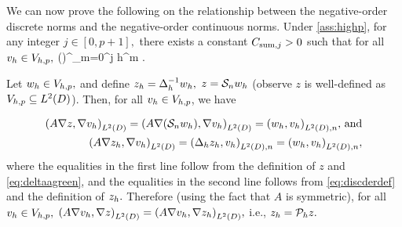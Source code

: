 
We can now prove the following  on the relationship between the negative-order discrete norms and the negative-order continuous norms.
\label{lem:negdiscsum}
Under \cref{ass:highp}, for any integer $j \in [0,p+1],$ there exists a constant $C_{\mathrm{sum},j} > 0$ such that for all $v_{h} \in V_{h,p},$
\beqs
{} \leq \mleft(\En\nvar\mright)^{}\Csumj \sum_{m=0}^j h^{m} .
\eeqs
\ele

Let $w_{h} \in V_{h,p},$ and define $z_{h} = \Delta_{h}^{-1} w_{h},$ $z = \mathcal S_{n} w_{h}$ (observe $z$ is well-defined as $\Vhp \subseteq \LtD$). Then, for all $v_{h} \in V_{h,p}$, we have

\begin{align*}
\IPLtD{A \grad z}{\grad \vh} = \IPLtD{A \grad \mleft(\sdsol \wh\mright)}{\grad \vh} = \IPLtDn{\wh}{\vh} \text{, and}\\
\IPLtD{A \grad \zh}{\grad \vh} = \IPLtDn{\Deltah \zh}{\vh} = \IPLtDn{\wh}{\vh},
\end{align*}
where the equalities in the first line follow from the definition of $z$ and \cref{eq:deltaagreen}, and the equalities in the second line follows from \cref{eq:discderdef} and the definition of $z_{h}.$  Therefore (using the fact that $A$ is symmetric), for all $v_{h} \in V_{h,p},$ $\IPLtD{A\grad \vh}{\grad z} = \IPLtD{A\grad \vh}{\grad \zh},$ i.e., $z_{h} = \mathcal P_{h} z.$

